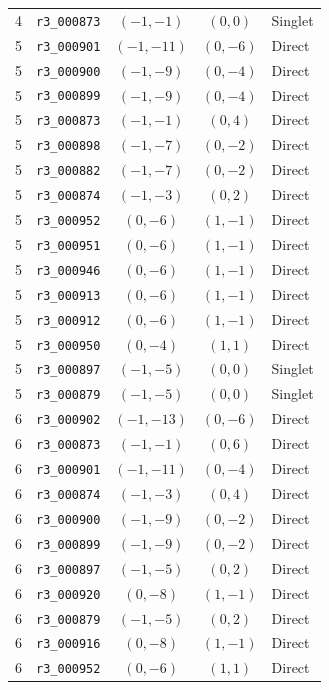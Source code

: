 \begin{longtable}{@{}rlccl@{}}
4 & \texttt{r3\_000873} & $(-1,-1)$ & $(0,0)$ & Singlet\\
5 & \texttt{r3\_000901} & $(-1,-11)$ & $(0,-6)$ & Direct\\
5 & \texttt{r3\_000900} & $(-1,-9)$ & $(0,-4)$ & Direct\\
5 & \texttt{r3\_000899} & $(-1,-9)$ & $(0,-4)$ & Direct\\
5 & \texttt{r3\_000873} & $(-1,-1)$ & $(0,4)$ & Direct\\
5 & \texttt{r3\_000898} & $(-1,-7)$ & $(0,-2)$ & Direct\\
5 & \texttt{r3\_000882} & $(-1,-7)$ & $(0,-2)$ & Direct\\
5 & \texttt{r3\_000874} & $(-1,-3)$ & $(0,2)$ & Direct\\
5 & \texttt{r3\_000952} & $(0,-6)$ & $(1,-1)$ & Direct\\
5 & \texttt{r3\_000951} & $(0,-6)$ & $(1,-1)$ & Direct\\
5 & \texttt{r3\_000946} & $(0,-6)$ & $(1,-1)$ & Direct\\
5 & \texttt{r3\_000913} & $(0,-6)$ & $(1,-1)$ & Direct\\
5 & \texttt{r3\_000912} & $(0,-6)$ & $(1,-1)$ & Direct\\
5 & \texttt{r3\_000950} & $(0,-4)$ & $(1,1)$ & Direct\\
5 & \texttt{r3\_000897} & $(-1,-5)$ & $(0,0)$ & Singlet\\
5 & \texttt{r3\_000879} & $(-1,-5)$ & $(0,0)$ & Singlet\\
6 & \texttt{r3\_000902} & $(-1,-13)$ & $(0,-6)$ & Direct\\
6 & \texttt{r3\_000873} & $(-1,-1)$ & $(0,6)$ & Direct\\
6 & \texttt{r3\_000901} & $(-1,-11)$ & $(0,-4)$ & Direct\\
6 & \texttt{r3\_000874} & $(-1,-3)$ & $(0,4)$ & Direct\\
6 & \texttt{r3\_000900} & $(-1,-9)$ & $(0,-2)$ & Direct\\
6 & \texttt{r3\_000899} & $(-1,-9)$ & $(0,-2)$ & Direct\\
6 & \texttt{r3\_000897} & $(-1,-5)$ & $(0,2)$ & Direct\\
6 & \texttt{r3\_000920} & $(0,-8)$ & $(1,-1)$ & Direct\\
6 & \texttt{r3\_000879} & $(-1,-5)$ & $(0,2)$ & Direct\\
6 & \texttt{r3\_000916} & $(0,-8)$ & $(1,-1)$ & Direct\\
6 & \texttt{r3\_000952} & $(0,-6)$ & $(1,1)$ & Direct\\

\end{longtable}
